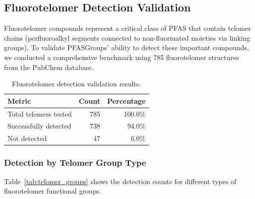 

\subsection*{Fluorotelomer Detection Validation}

Fluorotelomer compounds represent a critical class of PFAS that contain telomer chains (perfluoroalkyl segments connected to non-fluorinated moieties via linking groups). To validate PFASGroups' ability to detect these important compounds, we conducted a comprehensive benchmark using 785 fluorotelomer structures from the PubChem database.

\begin{table}[htbp]
\centering
\caption{Fluorotelomer detection validation results.}
\label{tab:telomer_validation}
\begin{tabular}{lrr}
\toprule
\rowcolor[HTML]{D6E4F5}\textbf{Metric} & \textbf{Count} & \textbf{Percentage} \\
\midrule
Total telomers tested & 785 & 100.0\% \\
\rowcolor[HTML]{FAEADE}Successfully detected & 738 & 94.0\% \\
Not detected & 47 & 6.0\% \\
\bottomrule
\end{tabular}
\end{table}

\subsubsection*{Detection by Telomer Group Type}

Table~\ref{tab:telomer_groups} shows the detection counts for different types of fluorotelomer functional groups.

